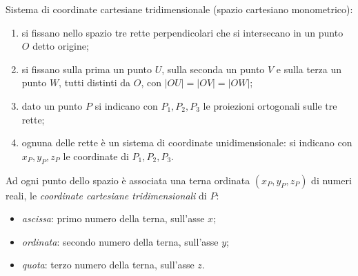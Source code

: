 \documentclass[11pt,a4paper]{article}
\theoremstyle{definition}
\begin{document}
Sistema di coordinate cartesiane tridimensionale (spazio cartesiano monometrico):
\begin{enumerate}
    \item si fissano nello spazio tre rette perpendicolari che si intersecano in un punto $O$ detto origine;
    \item si fissano sulla prima un punto $U$, sulla seconda un punto $V$ e sulla terza un punto $W$, tutti distinti da $O$, con $|OU| = |OV| = |OW|$;
    \item dato un punto $P$ si indicano con $P_1, P_2, P_3$ le proiezioni ortogonali sulle tre rette;
    \item ognuna delle rette è un sistema di coordinate unidimensionale: si indicano con $x_P, y_P, z_P$ le coordinate di $P_1, P_2, P_3$.
\end{enumerate}
Ad ogni punto dello spazio è associata una terna ordinata $(x_P, y_P, z_P)$ di numeri reali, le \emph{coordinate cartesiane tridimensionali} di $P$:
\begin{itemize}
    \item \emph{ascissa}: primo numero della terna, sull'asse $x$;
    \item \emph{ordinata}: secondo numero della terna, sull'asse $y$;
    \item \emph{quota}: terzo numero della terna, sull'asse $z$.
\end{itemize}

\begin{center}
\end{center}
\end{document}
